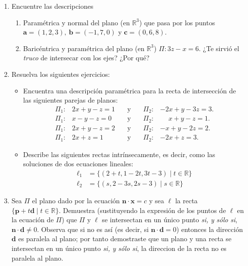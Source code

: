 \documentclass[a4paper, 12pt]{article}
\begin{document}
\begin{enumerate}
\item Encuentre las descripciones 
\begin{enumerate}
    \item Paramétrica y normal del plano (en $\mathbb{R}^3$) que pasa por los puntos $\mathbf{a} = (1, 2, 3),\ \mathbf{b} = (-1, 7, 0)$ y $\mathbf{c} = (0, 6, 8)$. 
    \item Baricéntrica y paramétrica del plano (en $\mathbb{R}^3$) $\Pi: 3z - x = 6$. ¿Te sirvió el \emph{truco} de intersecar con los ejes? ¿Por qué? 
\end{enumerate} 

\item Resuelva los siguientes ejercicios:
\begin{itemize}
\item Encuentra una descripción paramétrica para la recta de intersección de las siguientes parejas de planos:
\[
\begin{array}{llcrl}
    \Pi_{1}: & 2 x+y-z=1 & \quad\text{y}\quad & \Pi_{2}: & -2 x+y-3 z=3. 
    \\
    \Pi_{1}: & x-y-z=0 & \quad\text{y}\quad & \Pi_{2}: &  \phantom{-} x+y-z=1. 
    \\
    \Pi_{1}: & 2 x+y-z=2 & \quad\text{y}\quad & \Pi_{2}: & -x+y-2 z=2. 
    \\
    \Pi_{1}: & 2 x+z=1 & \quad\text{y}\quad & \Pi_{2}: & -2 x+z=3.
\end{array} 
\]

\item Describe las siguientes rectas intrínsecamente, es decir, como las soluciones de dos ecuaciones lineales:
\begin{align*}
\ell_{1} & =\{(2 + t, 1 - 2t, 3t -  3) \mid  t \in \mathbb{R}\}
\\
\ell_{2} & =\{(s, 2 - 3 s, 2s - 3) \mid s \in \mathbb{R}\}
\end{align*} 
\end{itemize}

\item Sea $\Pi$ el plano dado por la ecuación $\mathbf{n} \cdot \mathbf{x} = c$ y sea $\ell$ la recta $\{\mathbf{p}+ t \mathbf{d} \mid  t \in \mathbb{R}\}$. Demuestra (sustituyendo la expresión de los puntos de $\ell$ en la ecuación de $\Pi$) que $\Pi$ y $\ell$ se intersectan en un único punto \emph{si, y sólo si}, $\mathbf{n} \cdot \mathbf{d} \neq 0$. Observa que si no es así (es decir, si $\mathbf{n} \cdot \mathbf{d}=0$) entonces la dirección $\mathbf{d}$ es paralela al plano; por tanto demostraste que un plano y una recta se intersectan en un único punto \emph{si, y sólo si}, la direccion de la recta no es paralela al plano.


\end{enumerate}
\end{document}
